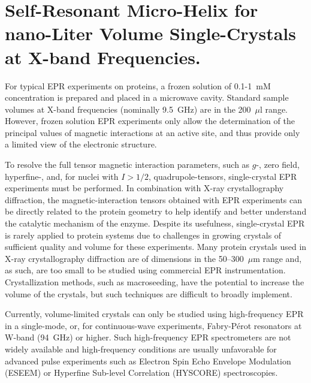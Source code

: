 \chapter[Self-Resonant Micro-Helix at X-band Frequencies]{Self-Resonant Micro-Helix for nano-Liter Volume Single-Crystals at X-band Frequencies.}

For typical EPR experiments on proteins, a frozen solution of 0.1-1~mM concentration is prepared and placed in a microwave cavity. Standard sample volumes at X-band frequencies (nominally 9.5~GHz) are in the 200~$\mu$l range. However, frozen solution EPR experiments only allow the determination of the principal values of magnetic interactions at an active site, and thus provide only a limited view of the electronic structure. \cite{schweiger2001principles, goldfarb2018epr}

To resolve the full tensor magnetic interaction parameters, such as $g$-, zero field, hyperfine-, and, for nuclei with $I>1/2$, quadrupole-tensors, single-crystal EPR experiments must be performed. In combination with X-ray crystallography diffraction, the magnetic-interaction tensors obtained with EPR experiments can be directly related to the protein geometry to help identify and better understand the catalytic mechanism of the enzyme. \cite{Bowman2016, NiFeRev2007} Despite its usefulness, single-crystal EPR is rarely applied to protein systems due to challenges in growing crystals of sufficient quality and volume for these experiments. Many protein crystals used in X-ray crystallography diffraction are of dimensions in the 50--300~$\mu$m range and, as such, are too small to be studied using commercial EPR instrumentation. Crystallization methods, such as macroseeding,\cite{macroseeding} have the potential to increase the volume of the crystals, but such techniques are difficult to broadly implement. 

Currently, volume-limited crystals can only be studied using high-frequency EPR in a single-mode\cite{Hofbauer6623}, or, for continuous-wave experiments, Fabry-P\'{e}rot\cite{Klette94GHzPSI} resonators at W-band (94~GHz) or higher. Such high-frequency EPR spectrometers are not widely available and high-frequency conditions are usually unfavorable for advanced pulse experiments such as Electron Spin Echo Envelope Modulation (ESEEM) or Hyperfine Sub-level Correlation (HYSCORE) spectroscopies. \cite{pulseseq}

